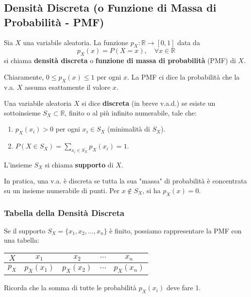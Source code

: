 \subsection{Densit\`a Discreta (o Funzione di Massa di Probabilit\`a - PMF)}
\begin{definition}
Sia $X$ una variabile aleatoria. La funzione $p_X: \mathbb{R} \to [0,1]$ data da
\[ p_X(x) = P(X=x), \quad \forall x \in \mathbb{R} \]
si chiama \textbf{densità discreta} o \textbf{funzione di massa di probabilità} (PMF) di $X$.
\end{definition}
Chiaramente, $0 \le p_X(x) \le 1$ per ogni $x$. La PMF ci dice la probabilità che la v.a. $X$ assuma esattamente il valore $x$.

\begin{definition}
Una variabile aleatoria $X$ si dice \textbf{discreta} (in breve v.a.d.) se esiste un sottoinsieme $S_X \subset \mathbb{R}$, finito o al più infinito numerabile, tale che:
\begin{enumerate}
    \item $p_X(x_i) > 0$ per ogni $x_i \in S_X$ (minimalità di $S_X$).
    \item $P(X \in S_X) = \sum_{x_i \in S_X} p_X(x_i) = 1$.
\end{enumerate}
L'insieme $S_X$ si chiama \textbf{supporto} di $X$.
\end{definition}
In pratica, una v.a. è discreta se tutta la sua "massa" di probabilità è concentrata su un insieme numerabile di punti. Per $x \notin S_X$, si ha $p_X(x) = 0$.

\subsubsection{Tabella della Densit\`a Discreta}
Se il supporto $S_X = \{x_1, x_2, \dots, x_n\}$ è finito, possiamo rappresentare la PMF con una tabella:
\begin{center}
\begin{tabular}{c|cccc}
$X$ & $x_1$ & $x_2$ & $\cdots$ & $x_n$ \\
\hline
$p_X$ & $p_X(x_1)$ & $p_X(x_2)$ & $\cdots$ & $p_X(x_n)$ \\
\end{tabular}
\end{center}
Ricorda che la somma di tutte le probabilità $p_X(x_i)$ deve fare 1.


